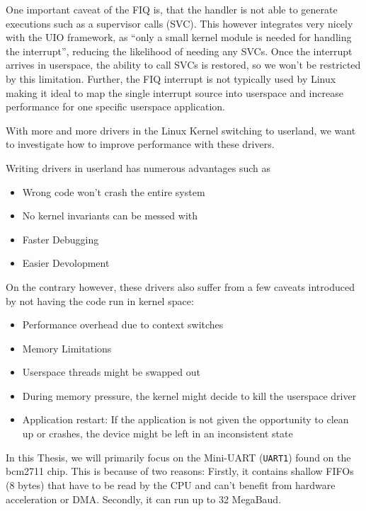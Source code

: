 \documentclass[../main.tex]{subfiles}
\begin{document}
    One important caveat of the FIQ is, that the handler is not able to generate executions such as a supervisor calls (SVC). This however integrates very nicely with the UIO framework, as \enquote{only a small kernel module is needed for handling the interrupt}, reducing the likelihood of needing any SVCs. Once the interrupt arrives in userspace, the ability to call SVCs is restored, so we won't be restricted by this limitation. Further, the FIQ interrupt is not typically used by Linux making it ideal to map the single interrupt source into userspace and increase performance for one specific userspace application.


    \clearpage

    With more and more drivers in the Linux Kernel switching to userland, we want to investigate how to improve performance with these drivers.

    Writing drivers in userland has numerous advantages such as
    \begin{itemize}
        \item Wrong code won't crash the entire system
        \item No kernel invariants can be messed with
        \item Faster Debugging
        \item Easier Devolopment
    \end{itemize}

    On the contrary however, these drivers also suffer from a few caveats introduced by not having the code run in kernel space:
    \begin{itemize}
        \item Performance overhead due to context switches
        \item Memory Limitations
        \item Userspace threads might be swapped out
        \item During memory pressure, the kernel might decide to kill the userspace driver
        \item Application restart: If the application is not given the opportunity to clean up or crashes, the device might be left in an inconsistent state
    \end{itemize}


    In this Thesis, we will primarily focus on the Mini-UART (\texttt{UART1}) found on the bcm2711 chip. This is because of two reasons: Firstly, it contains shallow FIFOs (8 bytes) that have to be read by the CPU and can't benefit from hardware acceleration or DMA. Secondly, it can run up to 32 MegaBaud.
\end{document}
